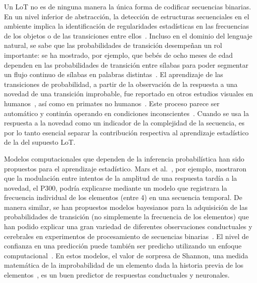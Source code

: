 Un LoT no es de ninguna manera la única forma de codificar secuencias binarias. En un nivel inferior de abstracción, la detección de estructuras secuenciales en el ambiente implica la identificación de regularidades estadísticas en las frecuencias de los objetos o de las transiciones entre ellos~\cite{f4,f20}. Incluso en el dominio del lenguaje natural, se sabe que las probabilidades de transición desempeñan un rol importante: se ha mostrado, por ejemplo, que bebés de ocho meses de edad dependen en las probabilidades de transición entre sílabas para poder segmentar un flujo continuo de sílabas en palabras distintas~\cite{f73,f74}. El aprendizaje de las transiciones de probabilidad, a partir de la observación de la respuesta a una novedad de una transición improbable, fue reportado en otros estudios visuales en humanos~\cite{f75,f76}, así como en primates no humanos~\cite{f77,f78}. Este proceso parece ser automático y continúa operando en condiciones inconscientes~\cite{f67,f71,f72}. Cuando se usa la respuesta a la novedad como un indicador de la complejidad de la secuencia, es por lo tanto esencial separar la contribución respectiva al aprendizaje estadístico de la del supuesto LoT.


Modelos computacionales que dependen de la inferencia probabilística han sido propuestos para el aprendizaje estadístico. Mars et al.~\cite{f79}, por ejemplo, mostraron que la modulación entre intentos de la amplitud de una respuesta tardía a la novedad, el P300, podría explicarse mediante un modelo que registrara la frecuencia individual de los elementos (entre 4) en una secuencia temporal. De manera similar, se han propuestos modelos bayesianos para la adquisición de las probabilidades de transición (no simplemente la frecuencia de los elementos) que han podido explicar una gran variedad de diferentes observaciones conductuales y cerebrales en experimentos de procesamiento de secuencias binarias~\cite{f20,f21}. El nivel de confianza en una predicción puede también ser predicho utilizando un enfoque computacional~\cite{f80,f81}. En estos modelos, el valor de sorpresa de Shannon, una medida matemática de la improbabilidad de un elemento dada la historia previa de los elementos~\cite{f82,shannon48,f84}, es un buen predictor de respuestas conductuales y neuronales.

